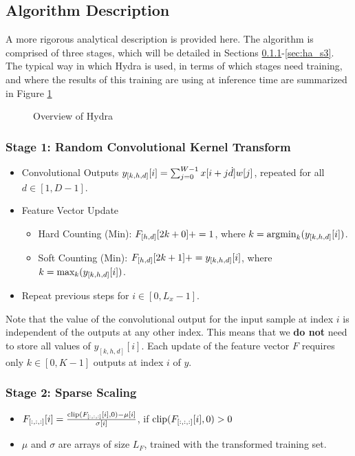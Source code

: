 \subsection{Algorithm Description}\label{sec:ha_algo_descr}
A more rigorous analytical description is provided here. The algorithm is comprised of three stages, which will be detailed in Sections \ref{sec:ha_s1}-\ref{sec:ha_s3}.
The typical way in which Hydra is used, in terms of which stages need training, and where the results of this training are using at inference time
are summarized in Figure \ref{fig:overview_hydra}
\begin{figure}[h!]

\caption{Overview of Hydra}
\label{fig:overview_hydra}
\end{figure}
\subsubsection{Stage 1: Random Convolutional Kernel Transform}\label{sec:ha_s1}

\begin{itemize}
    \item Convolutional Outputs $y\sb{[k,h,d]}[i] = \sum\sb{j=0}^{W-1} x[i+j\dot d] w[j]$, repeated for all $d \in [1,D-1]$.
    \item Feature Vector Update
        \begin{itemize}
            \item Hard Counting (Min): $F\sb{[h,d]}[2k+0] += 1$,              where $k = \text{argmin}\sb{k} (y\sb{[k,h,d]}[i])$.
            \item Soft Counting (Min): $F\sb{[h,d]}[2k+1] += y_{[k,h,d]}[i]$, where $k = \text{max}\sb{k} (y\sb{[k,h,d]}[i])$.
        \end{itemize}
    \item Repeat previous steps for $i \in [0, L_x-1]$. 
\end{itemize}
Note that the value of the convolutional output for the input sample at index $i$ is independent of the outputs at any other index.
This means that we \textbf{do not} need to store all values of $y_{[k,h,d]}[i]$. Each update of the feature vector $F$ requires only $k \in [0,K-1]$ outputs at index $i$ of $y$.

\subsubsection{Stage 2: Sparse Scaling}\label{sec:ha_s2}
\begin{itemize}
    \item $F\sb{[:,:,:]}[i] = \frac{\text{clip}(F\sb{[:,:,:]}[i],0) - \mu[i]}{\sigma[i]}$, if $\text{clip}(F\sb{[:,:,:]}[i],0) > 0$
    \item $\mu$ and $\sigma$ are arrays of size $L_F$, trained with the transformed training set.
\end{itemize}

